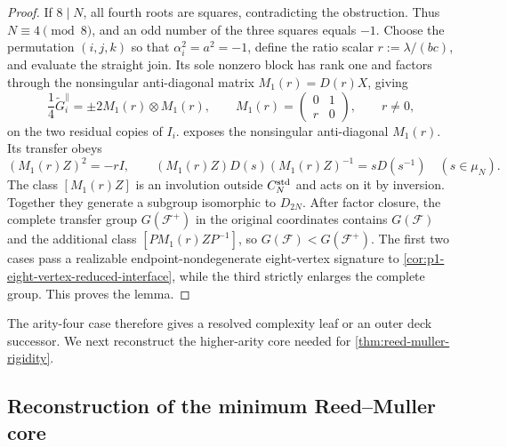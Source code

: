 \documentclass[11pt,letterpaper,onecolumn]{article}
\theoremstyle{plain}
\theoremstyle{definition}
\theoremstyle{remark}
\newcommand{\cF}{\mathcal F}
\begin{document}
\begin{proof}
If \(8\mid N\), all fourth roots are squares, contradicting the
  obstruction.  Thus \(N\equiv4\pmod8\), and an odd number of the three
  squares equals \(-1\).  Choose the permutation \((i,j,k)\) so that
  \(\alpha_i^2=a^2=-1\), define the ratio scalar
  \(r:=\lambda/(bc)\), and evaluate the straight join.  Its sole nonzero
block has rank one and factors through the nonsingular anti-diagonal matrix
\(M_1(r)=D(r)X\), giving
\begin{equation*}
  \frac14\widetilde G_i^\parallel
  =\pm2 M_1(r)\otimes M_1(r),
  \qquad
  M_1(r)=\begin{pmatrix}0&1\\ r&0\end{pmatrix},
  \qquad r\ne0,
\end{equation*}
on the two residual copies of \(I_i\).   exposes
the nonsingular anti-diagonal \(M_1(r)\). Its transfer obeys
\[
  (M_1(r)Z)^2=-rI,
  \qquad
  (M_1(r)Z)D(s)(M_1(r)Z)^{-1}=sD(s^{-1})\quad(s\in\mu_N).
\]
The class \([M_1(r)Z]\) is an involution outside \(C_N^{\rm std}\) and acts on it by inversion.
Together they generate a subgroup isomorphic to \(D_{2N}\).
After factor closure, the complete transfer group \(G(\cF^+)\) in the original coordinates contains
\(G(\cF)\) and the additional class \([P M_1(r)Z P^{-1}]\), so \(G(\cF)<G(\cF^+)\). The first two cases
pass a realizable endpoint-nondegenerate eight-vertex signature to
\cref{cor:p1-eight-vertex-reduced-interface}, while the third strictly enlarges the
complete group.  This proves the lemma.
\end{proof}

The arity-four case therefore gives a resolved complexity leaf or an
outer deck successor. We next reconstruct the higher-arity core needed
for \cref{thm:reed-muller-rigidity}.



\subsection{Reconstruction of the minimum Reed--Muller core}
\end{document}

